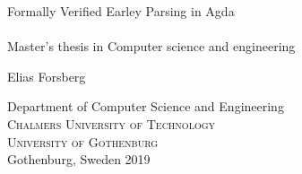 

\newcommand{\me}{Elias Forsberg}
\newcommand{\titleA}{Formally Verified Earley Parsing in Agda}
\newcommand{\titleB}{~}

\begin{titlepage}
			
\addtolength{\voffset}{2cm}

\begin{figure}[H]
\centering
\vspace{1cm}	%
\end{figure}

\mbox{}
\vfill
\renewcommand{\familydefault}{\sfdefault} \normalfont %
{\Huge 	\titleA	%
		} 	\\[0.5cm]
{\Large \titleB}\\[0.5cm]
Master's thesis in Computer science and engineering \vspace{1cm}

{\Large \me} \vspace{2.9cm}

Department of Computer Science and Engineering \\
\textsc{Chalmers University of Technology} \\
\textsc{University of Gothenburg} \\
Gothenburg, Sweden 2019

\renewcommand{\familydefault}{\rmdefault} \normalfont %
\end{titlepage}


\newpage
\restoregeometry
\thispagestyle{empty}
\mbox{}


